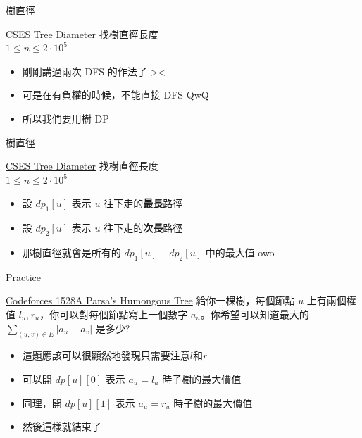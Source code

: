 \documentclass[aspectratio=169]{beamer}
\begin{document}
    \begin{frame}{樹直徑}
        \begin{block}{\href{https://cses.fi/problemset/task/1131/}{CSES Tree Diameter}}
        找樹直徑長度\\
        $1\leq n \leq 2 \cdot 10^5$
        \end{block}
        \begin{itemize}
            \item<2-> 剛剛講過兩次 DFS 的作法了 ><
            \item<2-> 可是在有負權的時候，不能直接 DFS QwQ
            \item<2-> 所以我們要用樹 DP
        \end{itemize}
    \end{frame}
    
    \begin{frame}{樹直徑}
        \begin{block}{\href{https://cses.fi/problemset/task/1131/}{CSES Tree Diameter}}
        找樹直徑長度\\
        $1\leq n \leq 2 \cdot 10^5$
        \end{block}
        \begin{itemize}
            \item 設 $dp_1[u]$ 表示 $u$ 往下走的\textbf{最長}路徑
            \item 設 $dp_2[u]$ 表示 $u$ 往下走的\textbf{次長}路徑
            \item 那樹直徑就會是所有的 $dp_1[u] + dp_2[u]$ 中的最大值 owo
        \end{itemize}
    \end{frame}
    
    \begin{frame}{Practice}
        \begin{block}{\href{https://codeforces.com/problemset/problem/1528/A}{Codeforces 1528A Parsa's Humongous Tree}}
        給你一棵樹，每個節點 $u$ 上有兩個權值 $l_u, r_u$，你可以對每個節點寫上一個數字 $a_u$。你希望可以知道最大的 $\sum_{(u,v)\in E} |a_u-a_v|$ 是多少?
        \end{block}
        \begin{itemize}
            \item<2-> 這題應該可以很顯然地發現只需要注意$l$和$r$
            \item<3-> 可以開 $dp[u][0]$ 表示 $a_u = l_u$ 時子樹的最大價值
            \item<3-> 同理，開 $dp[u][1]$ 表示 $a_u = r_u$ 時子樹的最大價值
            \item<4-> 然後這樣就結束了
        \end{itemize}
    \end{frame}
    
\end{document}
